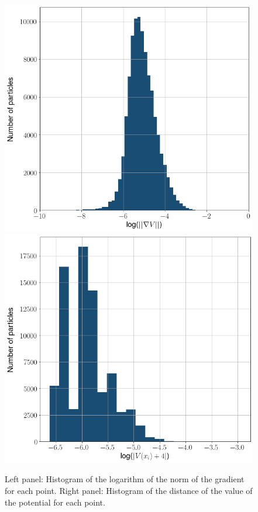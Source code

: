 \documentclass[11pt]{article}
\begin{document}
		\begin{figure}
			\centering
			\includegraphics[scale=0.35]{Figures/log_grad_V_hist.png}
			\quad
			\includegraphics[scale=0.35]{Figures/log_Vp4_hist.png}
			\caption{Left panel: Histogram of the logarithm of the norm of the gradient for each point. Right panel: Histogram of the distance of the value of the potential for each point.}
			\label{fig:Analyze_V_points}
		\end{figure}
		
\end{document}
